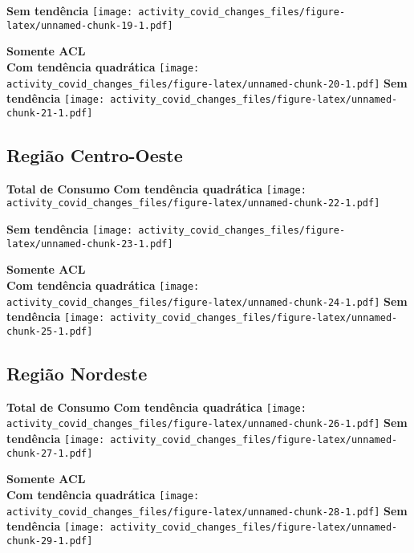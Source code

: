 \documentclass[
]{article}
\begin{document}
\textbf{Sem tendência}
\texttt{[image: activity\_covid\_changes\_files/figure-latex/unnamed-chunk-19-1.pdf]}

\pagebreak

\textbf{Somente ACL}\\
\textbf{Com tendência quadrática}
\texttt{[image: activity\_covid\_changes\_files/figure-latex/unnamed-chunk-20-1.pdf]}
\textbf{Sem tendência}
\texttt{[image: activity\_covid\_changes\_files/figure-latex/unnamed-chunk-21-1.pdf]}

\pagebreak

\hypertarget{regiuxe3o-centro-oeste-1}{%
\subsection{Região Centro-Oeste}\label{regiuxe3o-centro-oeste-1}}

\textbf{Total de Consumo} \textbf{Com tendência quadrática}
\texttt{[image: activity\_covid\_changes\_files/figure-latex/unnamed-chunk-22-1.pdf]}

\textbf{Sem tendência}
\texttt{[image: activity\_covid\_changes\_files/figure-latex/unnamed-chunk-23-1.pdf]}

\pagebreak

\textbf{Somente ACL}\\
\textbf{Com tendência quadrática}
\texttt{[image: activity\_covid\_changes\_files/figure-latex/unnamed-chunk-24-1.pdf]}
\textbf{Sem tendência}
\texttt{[image: activity\_covid\_changes\_files/figure-latex/unnamed-chunk-25-1.pdf]}

\pagebreak

\hypertarget{regiuxe3o-nordeste-1}{%
\subsection{Região Nordeste}\label{regiuxe3o-nordeste-1}}

\textbf{Total de Consumo} \textbf{Com tendência quadrática}
\texttt{[image: activity\_covid\_changes\_files/figure-latex/unnamed-chunk-26-1.pdf]}
\textbf{Sem tendência}
\texttt{[image: activity\_covid\_changes\_files/figure-latex/unnamed-chunk-27-1.pdf]}

\pagebreak

\textbf{Somente ACL}\\
\textbf{Com tendência quadrática}
\texttt{[image: activity\_covid\_changes\_files/figure-latex/unnamed-chunk-28-1.pdf]}
\textbf{Sem tendência}
\texttt{[image: activity\_covid\_changes\_files/figure-latex/unnamed-chunk-29-1.pdf]}
\end{document}
